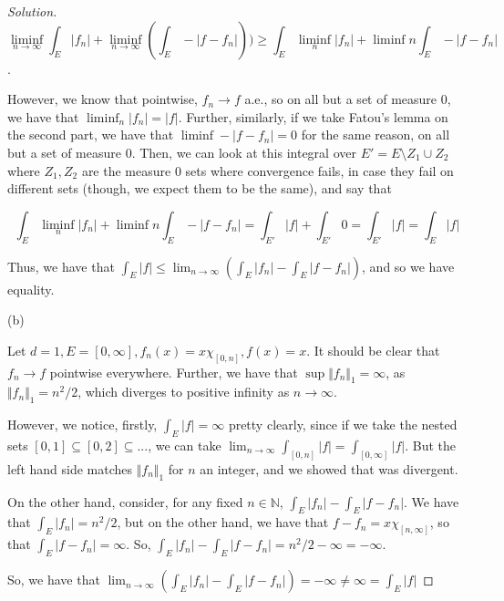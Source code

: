 \documentclass[10pt]{article}
\begin{document}
\begin{proof}[Solution]
$$ \liminf_{n \to \infty}\int_E |f_n| + \liminf_{n \to \infty}(\int_E -|f - f_n|)) \geq \int_E \liminf_n |f_n|  + \liminf{n} \int_E -|f - f_n|$$.

However, we know that pointwise, $f_n \to f$ a.e., so on all but a set of measure 0, we have that $\liminf_n |f_n| = |f|$. Further, similarly, if we take Fatou's lemma on the second  part, we have that $\liminf -| f - f_n| = 0$ for the same reason, on all but a set of measure 0. Then, we can look at this integral over $E' = E \setminus Z_1 \cup Z_2$ where $Z_1, Z_2$ are the measure 0 sets where convergence fails, in case they fail on different sets (though, we expect them to be the same), and say that 

$$ \int_E \liminf_n |f_n|  + \liminf{n} \int_E -|f - f_n| = \int_{E'} |f| + \int_{E'}0 = \int_{E'} |f| = \int_E |f|$$ 

Thus, we have that $\int_E |f| \leq \lim_{n \to \infty}(\int_E |f_n| - \int_E |f - f_n|)$, and so we have equality.

(b)

Let $d = 1, E = [0,\infty], f_n(x) = x \chi_{[0,n]}, f(x) = x$. It should be clear that $f_n \to f$ pointwise everywhere. Further, we have that $\sup \Vert f_n \Vert_1 = \infty$, as $\Vert f_n \Vert_1 = n^2/2$, which diverges to positive infinity as $ n \to \infty$. 

However, we notice, firstly, $\int_E |f| = \infty$ pretty clearly, since if we take the nested sets $[0,1] \subseteq [0,2] \subseteq ... $, we can take $\lim_{n \to \infty} \int_{[0,n]} |f| = \int_{[0,\infty]} |f|$. But the left hand side matches $\Vert f_n \Vert_1$ for $n$ an integer, and we showed that was divergent.

On the other hand, consider, for any fixed $n \in \mathbb{N}$, $\int_E |f_n| - \int_E |f - f_n|$. We have that $\int_E |f_n| = n^2/2$, but on the other hand, we have that $f - f_n = x \chi_{[n,\infty]}$, so that $\int_E |f - f_n| = \infty$. So, $\int_E |f_n| - \int_E |f - f_n| =  n^2/2 - \infty = -\infty$.

So, we have that $ \lim_{n \to \infty}(\int_E |f_n| - \int_E |f - f_n|) = -\infty \not = \infty = \int_E |f|$




\end{proof}
\end{document}
